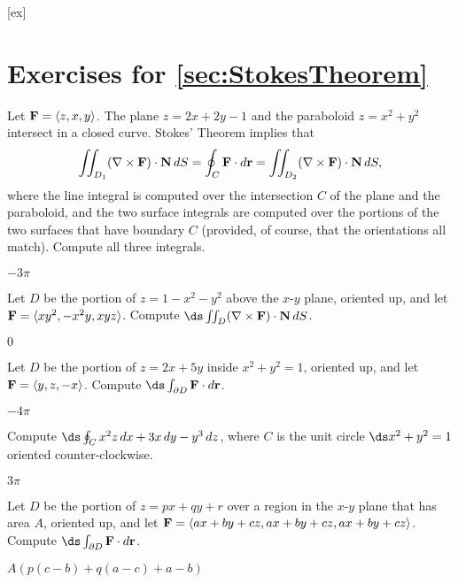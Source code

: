 [ex]
\section*{Exercises for \ref{sec:StokesTheorem}}

\begin{enumialphparenastyle}

\begin{ex}
Let ${\bf F}=\langle z,x,y\rangle$.
The plane $z=2x+2y-1$ and the paraboloid $z=x^2+y^2$ intersect in a
closed curve. Stokes' Theorem implies that
$$\iint_{D_1} (\nabla\times{\bf F})\cdot {\bf N}\,dS=
\oint_C {\bf F}\cdot d{\bf r}=
\iint_{D_2} (\nabla\times{\bf F})\cdot {\bf N}\,dS,
$$
where the line integral is computed over the intersection $C$ of the plane
and the paraboloid, and the two surface integrals are computed over
the portions of the two surfaces that have boundary $C$ (provided, of
course, that the orientations all match). Compute all three integrals.
\begin{sol}
	$-3\pi$
\end{sol}
\end{ex}

\begin{ex}
Let $D$ be the portion of $z=1-x^2-y^2$ above the $x$-$y$
plane, oriented up, and let ${\bf F}=\langle
xy^2,-x^2y,xyz\rangle$. Compute $\ds\iint_{D} (\nabla\times{\bf
F})\cdot {\bf N}\,dS$.
\begin{sol}
	$0$
\end{sol}
\end{ex}

\begin{ex}
Let $D$ be the portion of $z=2x+5y$ inside $x^2+y^2=1$,
oriented up, and
let ${\bf F}=\langle y,z,-x\rangle$. Compute
$\ds\int_{\partial D} {\bf F}\cdot d{\bf r}$.
\begin{sol}
	$-4\pi$
\end{sol}
\end{ex}

\begin{ex}
Compute $\ds\oint_C x^2z\,dx + 3x\,dy - y^3\,dz$, where $C$
is the unit circle $\ds x^2+y^2=1$ oriented counter-clockwise.
\begin{sol}
	$3\pi$
\end{sol}
\end{ex}

\begin{ex}
Let $D$ be the portion of $z=px+qy+r$ over a region in the
$x$-$y$ plane that has area $A$, oriented up, and 
let ${\bf F}=\langle ax+by+cz,ax+by+cz,ax+by+cz\rangle$. Compute
$\ds\int_{\partial D} {\bf F}\cdot d{\bf r}$.
\begin{sol}
	$A(p(c-b)+q(a-c)+a-b)$
\end{sol}
\end{ex}


\end{enumialphparenastyle}
